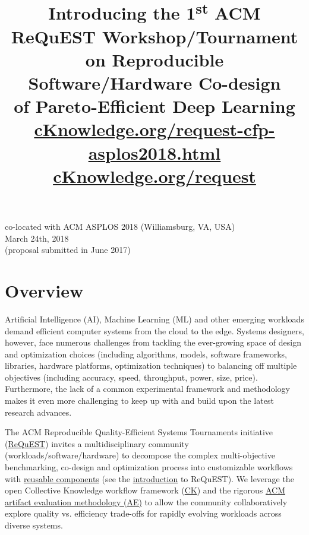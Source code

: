 \documentclass[10pt,onecolumn]{article}
\date{}
\begin{document}
\title{Introducing the 1\textsuperscript{st} ACM ReQuEST Workshop/Tournament \\
on Reproducible Software/Hardware Co-design \\
of Pareto-Efficient Deep Learning\\[.5cm]
\textbf{\href{http://cKnowledge.org/request-cfp-asplos2018.html}{cKnowledge.org/request-cfp-asplos2018.html}}
\textbf{\href{http://cKnowledge.org/request}{cKnowledge.org/request}}
}

\author{}

\maketitle
\thispagestyle{empty}
\pagestyle{empty}

\begin{center}
co-located with ACM ASPLOS 2018 (Williamsburg, VA, USA) \\
March 24th, 2018 \\
(proposal submitted in June 2017)
\end{center}

\section*{Overview}
\label{sec:overview}

Artificial Intelligence (AI), Machine Learning (ML) and other
emerging workloads demand efficient computer systems from the
cloud to the edge. Systems designers, however, face numerous
challenges from tackling the ever-growing space of design and
optimization choices (including algorithms, models, software
frameworks, libraries, hardware platforms, optimization
techniques) to balancing off multiple objectives (including
accuracy, speed, throughput, power, size, price). Furthermore,
the lack of a common experimental framework and methodology
makes it even more challenging to keep up with and build upon
the latest research advances.

The ACM Reproducible Quality-Efficient Systems Tournaments
initiative (\href{http://cKnowledge.org/request}{ReQuEST}) 
invites a multidisciplinary community
(workloads/software/hardware) to decompose the complex
multi-objective benchmarking, co-design and optimization
process into customizable workflows with \href{https://github.com/ctuning/ck/wiki#user-content-reusable-ck-components}{reusable components}
(see the \href{https://arxiv.org/abs/1801.06378}{introduction} to ReQuEST). We leverage the open
Collective Knowledge workflow framework (\href{https://github.com/ctuning/ck}{CK}) 
and the rigorous \href{http://cTuning.org/ae}{ACM artifact evaluation methodology (AE)} to allow the
community collaboratively explore quality vs. efficiency
trade-offs for rapidly evolving workloads across diverse
systems.
\end{document}
